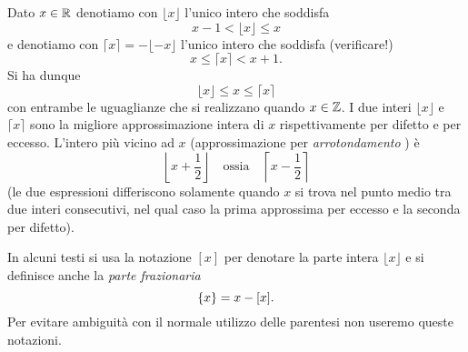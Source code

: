 \begin{definition}
  \mymark{**}%
%
  Dato $x\in {\mathbb R}$ denotiamo con $\lfloor x\rfloor$ l'unico intero
  che soddisfa
  \mymargin{$\lfloor\cdot\rfloor$} %
  \[
    x - 1 < \lfloor x \rfloor \le x
  \]
  e denotiamo con $\lceil x \rceil = - \lfloor -x \rfloor$ l'unico intero che soddisfa (verificare!)
  \mymargin{$\lceil\cdot\rceil$} %
  \[
    x \le \lceil x \rceil < x + 1.
  \]
  Si ha dunque
  \[
    \lfloor x \rfloor \le x \le \lceil x \rceil
  \]
  con entrambe le uguaglianze che si realizzano quando $x\in {\mathbb Z}$.
  I due interi $\lfloor x \rfloor$ e $\lceil x \rceil$
  sono la migliore approssimazione intera di $x$ rispettivamente
  per difetto e per eccesso.
  L'intero più vicino ad $x$ (approssimazione per \emph{arrotondamento}%
%
)
  è
  \[
    \left\lfloor x + \frac 1 2 \right\rfloor
  \quad \text{ossia} \quad
    \left\lceil x-\frac 1 2 \right\rceil
  \]
  (le due espressioni differiscono solamente quando $x$ si trova nel punto medio tra 
  due interi consecutivi, nel qual caso la prima approssima per eccesso e la seconda 
  per difetto).
\end{definition}

In alcuni testi si usa la notazione $[x]$ per denotare la parte intera $\lfloor x \rfloor$ e si definisce
anche la \emph{parte frazionaria}
\[
  {\left\{ x \right\}} = x - [x].
\]
Per evitare ambiguità con il normale utilizzo delle parentesi
non useremo queste notazioni.

